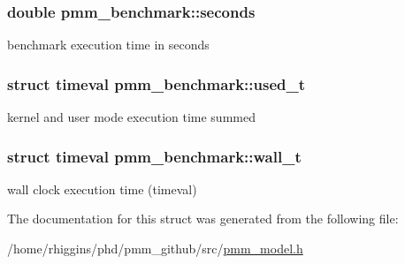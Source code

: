 \hypertarget{structpmm__benchmark_a20f884c7d28b5449b300ea4adcdc56c5}{
\subsubsection[{seconds}]{\setlength{\rightskip}{0pt plus 5cm}double pmm\-\_\-benchmark\-::seconds}}\label{structpmm__benchmark_a20f884c7d28b5449b300ea4adcdc56c5}


benchmark execution time in seconds 

\hypertarget{structpmm__benchmark_a5ddf544feb0ebedcbb44aab727652fe7}{
\subsubsection[{used\-\_\-t}]{\setlength{\rightskip}{0pt plus 5cm}struct timeval pmm\-\_\-benchmark\-::used\-\_\-t}}\label{structpmm__benchmark_a5ddf544feb0ebedcbb44aab727652fe7}


kernel and user mode execution time summed 

\hypertarget{structpmm__benchmark_a0523de7c2b09ca2a96bbee433a567a9e}{
\subsubsection[{wall\-\_\-t}]{\setlength{\rightskip}{0pt plus 5cm}struct timeval pmm\-\_\-benchmark\-::wall\-\_\-t}}\label{structpmm__benchmark_a0523de7c2b09ca2a96bbee433a567a9e}


wall clock execution time (timeval) 



The documentation for this struct was generated from the following file\-:\begin{DoxyCompactItemize}
\item 
/home/rhiggins/phd/pmm\-\_\-github/src/\hyperlink{pmm__model_8h}{pmm\-\_\-model.\-h}\end{DoxyCompactItemize}
